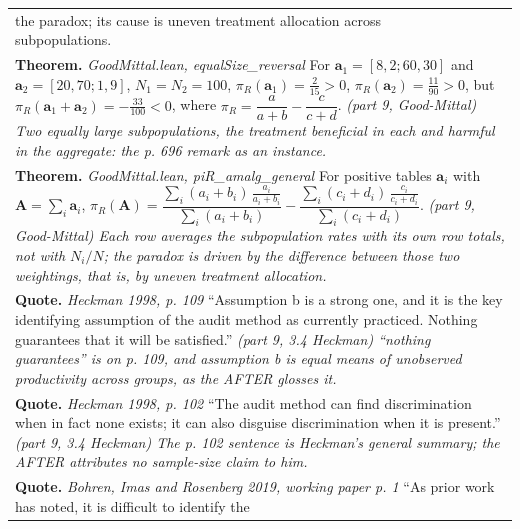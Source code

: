\documentclass[10pt]{article}
\theoremstyle{definition}
\newlength{\fullw}\setlength{\fullw}{25.9cm}
\begin{document}
{\begin{longtable}{|p{0.9cm}|p{12.2cm}|p{12.2cm}|}
{{the paradox; its cause is uneven treatment allocation across
subpopulations.}} \\
\multicolumn{3}{|p{\fullw}|}{\textbf{Theorem.} \textit{GoodMittal.lean, equalSize\_reversal} \newline For $\mathbf{a}_1 = [8, 2; 60, 30]$ and $\mathbf{a}_2 = [20, 70; 1, 9]$,
$N_1 = N_2 = 100$, $\pi_R(\mathbf{a}_1) = \tfrac{2}{15} > 0$,
$\pi_R(\mathbf{a}_2) = \tfrac{11}{90} > 0$, but
$\pi_R(\mathbf{a}_1 + \mathbf{a}_2) = -\tfrac{33}{100} < 0$, where
$\pi_R = \dfrac{a}{a+b} - \dfrac{c}{c+d}$. \newline \textit{(part 9, Good-Mittal) Two equally large subpopulations, the
treatment beneficial in each and harmful in the aggregate: the p. 696 remark
as an instance.}} \\
\multicolumn{3}{|p{\fullw}|}{\textbf{Theorem.} \textit{GoodMittal.lean, piR\_amalg\_general} \newline For positive tables $\mathbf{a}_i$ with $\mathbf{A} = \sum_i \mathbf{a}_i$,
$\pi_R(\mathbf{A}) = \dfrac{\sum_i (a_i+b_i)\,\frac{a_i}{a_i+b_i}}{\sum_i (a_i+b_i)}
- \dfrac{\sum_i (c_i+d_i)\,\frac{c_i}{c_i+d_i}}{\sum_i (c_i+d_i)}$. \newline \textit{(part 9, Good-Mittal) Each row averages the subpopulation rates
with its own row totals, not with $N_i/N$; the paradox is driven by the
difference between those two weightings, that is, by uneven treatment
allocation.}} \\
\multicolumn{3}{|p{\fullw}|}{\textbf{Quote.} \textit{Heckman 1998, p. 109} \newline ``Assumption b is a strong one, and it is the key identifying
assumption of the audit method as currently practiced. Nothing guarantees
that it will be satisfied.'' \newline \textit{(part 9, 3.4 Heckman) ``nothing guarantees'' is on p. 109, and
assumption b is equal means of unobserved productivity across groups, as the
AFTER glosses it.}} \\
\multicolumn{3}{|p{\fullw}|}{\textbf{Quote.} \textit{Heckman 1998, p. 102} \newline ``The audit method can find discrimination when in fact none
exists; it can also disguise discrimination when it is present.'' \newline \textit{(part 9, 3.4 Heckman) The p. 102 sentence is Heckman's general
summary; the AFTER attributes no sample-size claim to him.}} \\
\multicolumn{3}{|p{\fullw}|}{\textbf{Quote.} \textit{Bohren, Imas and Rosenberg 2019, working paper p. 1} \newline ``As prior work has noted, it is difficult to identify the
}
\end{longtable}}
\end{document}

